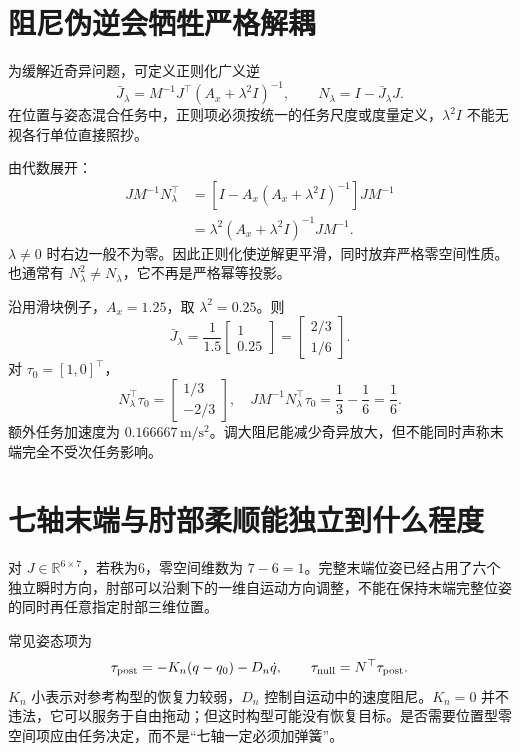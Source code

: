 \section{阻尼伪逆会牺牲严格解耦}

为缓解近奇异问题，可定义正则化广义逆
\[
\bar J_\lambda=M^{-1}J^\top(A_x+\lambda^2I)^{-1},
\qquad N_\lambda=I-\bar J_\lambda J.
\]
在位置与姿态混合任务中，正则项必须按统一的任务尺度或度量定义，$\lambda^2I$ 不能无视各行单位直接照抄。

由代数展开：
\begin{align}
JM^{-1}N_\lambda^\top
&=[I-A_x(A_x+\lambda^2I)^{-1}]JM^{-1}\\
&=\lambda^2(A_x+\lambda^2I)^{-1}JM^{-1}.
\end{align}
$\lambda\ne0$ 时右边一般不为零。因此正则化使逆解更平滑，同时放弃严格零空间性质。也通常有 $N_\lambda^2\ne N_\lambda$，它不再是严格幂等投影。

\begin{examplebox}[算例 16D 算出正则化带来的主任务泄漏]
沿用滑块例子，$A_x=1.25$，取 $\lambda^2=0.25$。则
\[
\bar J_\lambda=\frac1{1.5}\begin{bmatrix}1\\0.25\end{bmatrix}
=\begin{bmatrix}2/3\\1/6\end{bmatrix}.
\]
对 $\tau_0=[1,0]^\top$，
\[
N_\lambda^\top\tau_0=\begin{bmatrix}1/3\\-2/3\end{bmatrix},
\quad JM^{-1}N_\lambda^\top\tau_0=\frac13-\frac16=\frac16.
\]
额外任务加速度为 $0.166667\,\mathrm{m/s^2}$。调大阻尼能减少奇异放大，但不能同时声称末端完全不受次任务影响。
\end{examplebox}

\section{七轴末端与肘部柔顺能独立到什么程度}

对 $J\in\mathbb R^{6\times7}$，若秩为6，零空间维数为 $7-6=1$。完整末端位姿已经占用了六个独立瞬时方向，肘部可以沿剩下的一维自运动方向调整，不能在保持末端完整位姿的同时再任意指定肘部三维位置。

常见姿态项为
\[
\tau_{\rm post}=-K_n(q-q_0)-D_n\dot q,
\qquad \tau_{\rm null}=N^\top\tau_{\rm post}.
\]
$K_n$ 小表示对参考构型的恢复力较弱，$D_n$ 控制自运动中的速度阻尼。$K_n=0$ 并不违法，它可以服务于自由拖动；但这时构型可能没有恢复目标。是否需要位置型零空间项应由任务决定，而不是“七轴一定必须加弹簧”。

